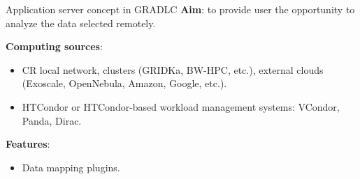 
\begin{frame}{Application server concept in GRADLC}
\textbf{Aim}: to provide user the opportunity to analyze the data selected remotely.
\vspace{\itemsep}

\textbf{Computing sources}:
  \begin{itemize}
    \item CR local network, clusters (GRIDKa, BW-HPC, etc.), external clouds (Exoscale, OpenNebula, Amazon, Google, etc.).
    \item HTCondor or HTCondor-based workload management systems: VCondor, Panda, Dirac.
  \end{itemize}
\vspace{\itemsep}

\textbf{Features}:
  \begin{itemize}
    \item Data mapping plugins.
  \end{itemize}
\end{frame}



